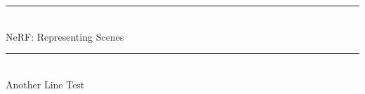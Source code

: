 \documentclass[titlepage]{article}
\begin{document}
\noindent
\rule{\textwidth}{0.4pt} \\[-1.5ex] %
{\fontsize{34}{40}\selectfont NeRF: Representing Scenes}

\vspace{2cm}

\noindent
\rule{\textwidth}{1pt} \\[-1ex]
{\fontsize{20}{24}\selectfont Another Line Test}
\end{document}
